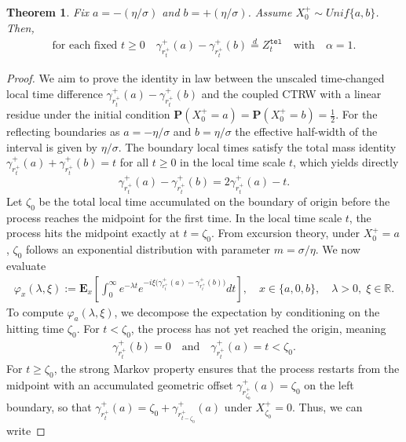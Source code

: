 \documentclass[10pt,a4paper]{article}
\numberwithin{equation}{section}
\theoremstyle{plain}
\newtheorem{theorem}{Theorem}
\theoremstyle{remark}
\begin{document}
\begin{theorem}
Fix $a = -(\eta/\sigma)$ and $b=+(\eta/\sigma)$. Assume $X^+_0 \sim Unif\{a,b\}$.  Then, 
\begin{align*}
\textrm{for each fixed $t\geq 0$} \quad \gamma^+_{r^+_t}(a) - \gamma^+_{r^+_t}(b) \stackrel{d}{=} Z^\mathtt{tel}_t  \quad \textrm{with} \quad \alpha =1.
\end{align*}
\label{thm:difUNO}
\end{theorem}

\begin{proof}
We aim to prove the identity in law between the unscaled time-changed local time difference $\gamma^+_{r^+_t}(a) - \gamma^+_{r^+_t}(b)$ and the coupled CTRW with a linear residue under the initial condition $\mathbf{P}(X^+_0 = a) = \mathbf{P}(X^+_0 = b) = \frac{1}{2}$. For the reflecting boundaries as $a = -\eta/\sigma$ and $b = \eta/\sigma$ the effective half-width of the interval is given by $\eta/\sigma$. The boundary local times satisfy the total mass identity $\gamma^+_{r^+_t}(a) + \gamma^+_{r^+_t}(b) = t$ for all $t \geq 0$ in the local time scale $t$, which yields directly
\begin{equation}
\gamma^+_{r^+_t}(a) - \gamma^+_{r^+_t}(b) = 2\gamma^+_{r^+_t}(a) - t.
\label{geom_red}
\end{equation}
Let $\zeta_0$ be the total local time accumulated on the boundary of origin before the process reaches the midpoint for the first time. In the local time scale $t$, the process hits the midpoint exactly at $t = \zeta_0$. From excursion theory, under $X^+_0 = a$, $\zeta_0$ follows an exponential distribution with parameter $m = \sigma/\eta$. We now evaluate
\begin{align*}
\varphi_x(\lambda, \xi):= \mathbf{E}_x\left[ \int_0^\infty e^{-\lambda t} e^{-i\xi \big( \gamma^+_{r^+_t}(a) - \gamma^+_{r^+_t}(b) \big)} dt\right], \quad x \in \{a,0,b\}, \quad \lambda>0, \; \xi \in \mathbb{R}.
\end{align*}
To compute $\varphi_a(\lambda, \xi)$, we decompose the expectation by conditioning on the hitting time $\zeta_0$. For $t < \zeta_0$, the process has not yet reached the origin, meaning 
\begin{align*}
\gamma^+_{r^+_t}(b) = 0 \quad \textrm{and} \quad \gamma^+_{r^+_t}(a) = t < \zeta_0.
\end{align*}
For $t \geq \zeta_0$, the strong Markov property ensures that the process restarts from the midpoint with an accumulated geometric offset $\gamma^+_{r^+_{\zeta_0}}(a) = \zeta_0$ on the left boundary, so that $\gamma^+_{r^+_t}(a) = \zeta_0 + \gamma^+_{r^+_{t-\zeta_0}}(a)$ under $X^+_{\zeta_0} = 0$. Thus, we can write

\end{proof}
\end{document}
